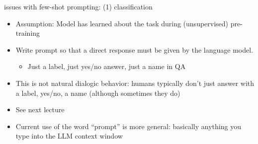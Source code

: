 \documentclass[11pt,compress,t,notes=noshow, xcolor=table]{beamer}
\begin{document}
\begin{frame}{issues with few-shot prompting: (1) classification}

\vfill

\begin{itemize}
    \item Assumption: Model has learned about the task during (unsupervised) pre-training 
    \item Write prompt so that  a direct response must be
    given by the language model.
\begin{itemize}
        \item Just a label, just yes/no answer, just a name
    in QA
\end{itemize}
    \item This is not natural dialogic behavior: humans
    typically don't
    just answer with a label, yes/no, a name (although
    sometimes they do)
    \item See next lecture
\item Current use of the word ``prompt'' is more general: basically
anything you type into the LLM context window

\end{itemize}

\vfill

\end{frame}
\end{document}
